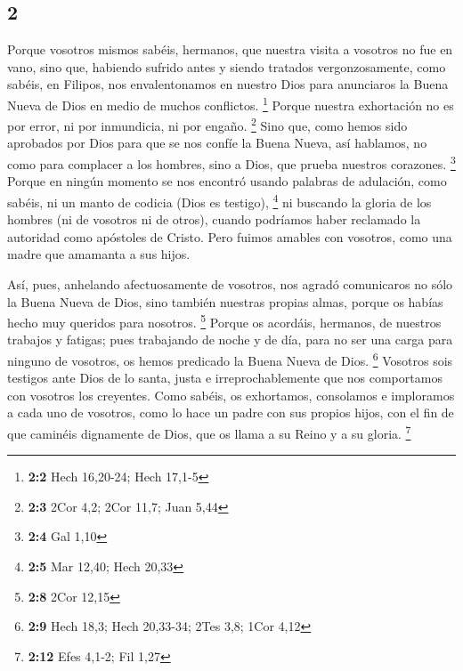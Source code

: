 \begin{paracol}{2}
\hypertarget{section-2}{%
\section{2}\label{section-2}}

 Porque vosotros mismos sabéis, hermanos, que nuestra
visita a vosotros no fue en vano,  sino que, habiendo
sufrido antes y siendo tratados vergonzosamente, como sabéis, en
Filipos, nos envalentonamos en nuestro Dios para anunciaros la Buena
Nueva de Dios en medio de muchos conflictos. \footnote{\textbf{2:2} Hech
  16,20-24; Hech 17,1-5}  Porque nuestra exhortación no es
por error, ni por inmundicia, ni por engaño. \footnote{\textbf{2:3} 2Cor
  4,2; 2Cor 11,7; Juan 5,44}  Sino que, como hemos sido
aprobados por Dios para que se nos confíe la Buena Nueva, así hablamos,
no como para complacer a los hombres, sino a Dios, que prueba nuestros
corazones. \footnote{\textbf{2:4} Gal 1,10}  Porque en
ningún momento se nos encontró usando palabras de adulación, como
sabéis, ni un manto de codicia (Dios es testigo), \footnote{\textbf{2:5}
  Mar 12,40; Hech 20,33}  ni buscando la gloria de los
hombres (ni de vosotros ni de otros), cuando podríamos haber reclamado
la autoridad como apóstoles de Cristo.  Pero fuimos
amables con vosotros, como una madre que amamanta a sus hijos.

 Así, pues, anhelando afectuosamente de vosotros, nos
agradó comunicaros no sólo la Buena Nueva de Dios, sino también nuestras
propias almas, porque os habías hecho muy queridos para nosotros.
\footnote{\textbf{2:8} 2Cor 12,15}  Porque os acordáis,
hermanos, de nuestros trabajos y fatigas; pues trabajando de noche y de
día, para no ser una carga para ninguno de vosotros, os hemos predicado
la Buena Nueva de Dios. \footnote{\textbf{2:9} Hech 18,3; Hech 20,33-34;
  2Tes 3,8; 1Cor 4,12}  Vosotros sois testigos ante Dios
de lo santa, justa e irreprochablemente que nos comportamos con vosotros
los creyentes.  Como sabéis, os exhortamos, consolamos e
imploramos a cada uno de vosotros, como lo hace un padre con sus propios
hijos,  con el fin de que caminéis dignamente de Dios,
que os llama a su Reino y a su gloria. \footnote{\textbf{2:12} Efes
  4,1-2; Fil 1,27}

\hypertarget{acciuxf3n-de-gracias-por-la-recepciuxf3n-voluntaria-del-mensaje-de-salvaciuxf3n-por-parte-de-la-comunidad-y-alabanza-por-su-constancia-en-el-sufrimiento}{%
}
\end{paracol}
